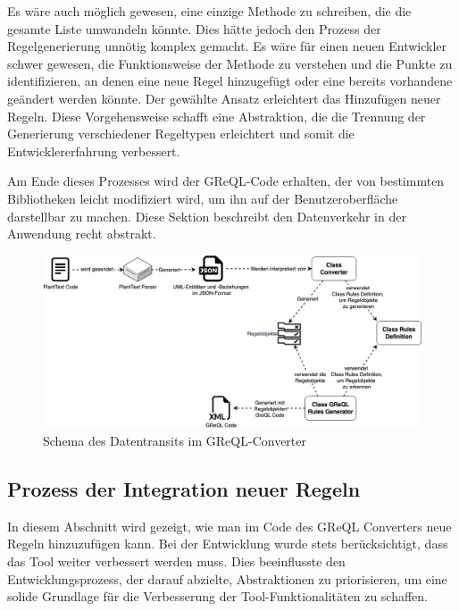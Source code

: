 Es wäre auch möglich gewesen, eine einzige Methode zu schreiben, die die gesamte Liste umwandeln könnte. Dies hätte
jedoch den Prozess der Regelgenerierung unnötig komplex gemacht. Es wäre für einen neuen Entwickler schwer gewesen, die
Funktionsweise der Methode zu verstehen und die Punkte zu identifizieren, an denen eine neue Regel hinzugefügt oder
eine bereits vorhandene geändert werden könnte. Der gewählte Ansatz erleichtert das Hinzufügen neuer Regeln. Diese
Vorgehensweise schafft eine Abstraktion, die die Trennung der Generierung verschiedener Regeltypen erleichtert und somit
die Entwicklererfahrung verbessert.

Am Ende dieses Prozesses wird der GReQL-Code erhalten, der von bestimmten Bibliotheken leicht modifiziert wird, um ihn
auf der Benutzeroberfläche darstellbar zu machen. Diese Sektion beschreibt den Datenverkehr in der Anwendung recht
abstrakt.

\begin{figure}[h!]
    \centering
    \includegraphics[width=14cm]{images/transit}
    \caption{Schema des Datentransits im GReQL-Converter}
    \label{fig:transit}
\end{figure}

\subsection{Prozess der Integration neuer Regeln}

In diesem Abschnitt wird gezeigt, wie man im Code des GReQL Converters neue Regeln hinzuzufügen kann. Bei der Entwicklung
wurde stets berücksichtigt, dass das Tool weiter verbessert werden muss. Dies beeinflusste den Entwicklungsprozess,
der darauf abzielte, Abstraktionen zu priorisieren, um eine solide Grundlage für die Verbesserung der
Tool-Funktionalitäten zu schaffen.

